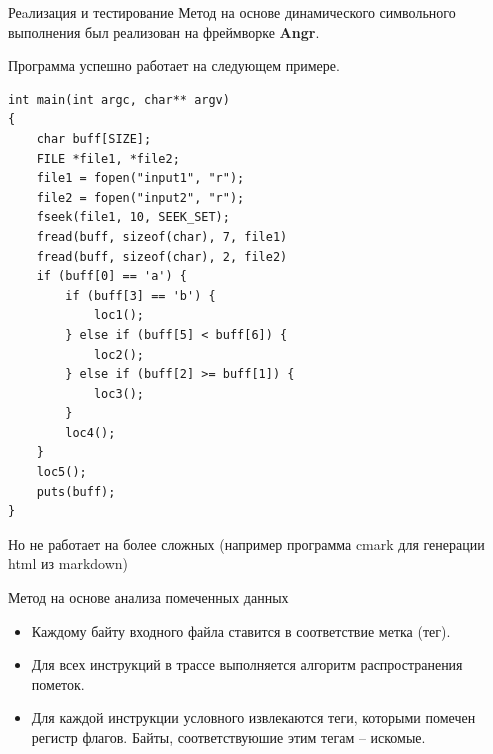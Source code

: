 \documentclass[10pt]{beamer}
\begin{document}

\begin{frame}[fragile]{Реaлизация и тестирование}
Метод на основе динамического символьного выполнения был реализован на фреймворке \textbf{Angr}.

Программа успешно работает на следующем примере.
\begin{lstlisting}[basicstyle=\ttfamily\tiny]
int main(int argc, char** argv)
{
    char buff[SIZE];
    FILE *file1, *file2;
    file1 = fopen("input1", "r");
    file2 = fopen("input2", "r");
    fseek(file1, 10, SEEK_SET);
    fread(buff, sizeof(char), 7, file1)
    fread(buff, sizeof(char), 2, file2)
    if (buff[0] == 'a') {
        if (buff[3] == 'b') {
            loc1();
        } else if (buff[5] < buff[6]) {
            loc2();
        } else if (buff[2] >= buff[1]) {
            loc3();
        }
        loc4();
    }
    loc5();
    puts(buff);
}
\end{lstlisting}
Но не работает на более сложных (например программа cmark для генерации html из markdown)

\end{frame}





\begin{frame}{Метод на основе анализа помеченных данных}

    \begin{itemize}
      \item Каждому байту входного файла ставится в соответствие метка (тег).
      \item Для всех инструкций в трассе выполняется алгоритм распространения пометок.
      \item Для каждой инструкции условного извлекаются теги, которыми помечен регистр флагов. Байты, соответствуюшие этим тегам -- искомые.
    \end{itemize}
\end{frame}
\end{document}
